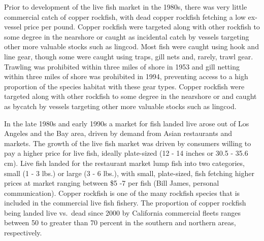 \documentclass[11pt,
  english,
  a4paper,
]{article}
\begin{document}
\leavevmode\tagmcend\tagstructend\par


Prior to development of the live fish market in the 1980s, there was very little commercial catch of copper rockfish, with dead copper rockfish fetching a low ex-vessel price per pound. Copper rockfish were targeted along with other rockfish to some degree in the nearshore or caught as incidental catch by vessels targeting other more valuable stocks such as lingcod. Most fish were caught using hook and line gear, though some were caught using traps, gill nets and, rarely, trawl gear. Trawling was prohibited within three miles of shore in 1953 and gill netting within three miles of shore was prohibited in 1994, preventing access to a high proportion of the species habitat with these gear types. Copper rockfish were targeted along with other rockfish to some degree in the nearshore or and caught as bycatch by vessels targeting other more valuable stocks such as lingcod.

\leavevmode\tagmcend\tagstructend\par


In the late 1980s and early 1990s a market for fish landed live arose out of Los Angeles and the Bay area, driven by demand from Asian restaurants and markets. The growth of the live fish market was driven by consumers willing to pay a higher price for live fish, ideally plate-sized (12 - 14 inches or 30.5 - 35.6 cm). Live fish landed for the restaurant market lump fish into two categories, small (1 - 3 lbs.) or large (3 - 6 lbs.), with small, plate-sized, fish fetching higher prices at market ranging between \$5 -7 per fish (Bill James, personal communication). Copper rockfish is one of the many rockfish species that is included in the commercial live fish fishery. The proportion of copper rockfish being landed live vs.~dead since 2000 by California commercial fleets ranges between 50 to greater than 70 percent in the southern and northern areas, respectively.

\leavevmode\tagmcend\tagstructend\par

\end{document}
